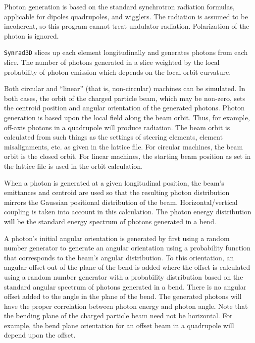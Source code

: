 \documentclass[11pt,openany]{report}
\newcommand{\srthree}{\texttt{Synrad3D}\xspace}
\begin{document}
Photon generation is based on the standard synchrotron radiation
formulas, applicable for dipoles quadrupoles, and wigglers. The
radiation is assumed to be incoherent, so this program cannot treat
undulator radiation. Polarization of the photon is ignored.

\srthree slices up each element longitudinally
and generates photons from each slice. The number of photons generated
in a slice weighted by the local probability of photon emission which
depends on the local orbit curvature.

Both circular and ``linear'' (that is, non-circular) machines can be
simulated.  In both cases, the orbit of the charged particle beam,
which may be non-zero, sets the centroid position and angular
orientation of the generated photons. Photon generation is based upon
the local field along the beam orbit. Thus, for example, off-axis
photons in a quadrupole will produce radiation. The beam orbit is
calculated from such things as the settings of steering elements,
element misalignments, etc. as given in the lattice file. For circular
machines, the beam orbit is the closed orbit. For linear machines, the
starting beam position as set in the lattice file is used in the orbit
calculation.

When a photon is generated at a given longitudinal position, the
beam's emittances and centroid are used so that the resulting photon
distribution mirrors the Gaussian positional distribution of the beam.
Horizontal/vertical coupling is taken into account in this
calculation. The photon energy distribution will be the standard
energy spectrum of photons generated in a bend.

A photon's initial angular orientation is generated by first using a
random number generator to generate an angular orientation using a
probability function that corresponds to the beam's angular
distribution. To this orientation, an angular offset out of the plane
of the bend is added where the offset is calculated using a random
number generator with a probability distribution based on the standard
angular spectrum of photons generated in a bend. There is no angular
offset added to the angle in the plane of the bend. The generated
photons will have the proper correlation between photon energy and
photon angle. Note that the bending plane of the charged particle beam
need not be horizontal. For example, the bend plane orientation for an
offset beam in a quadrupole will depend upon the offset.

\end{document}
